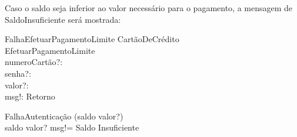 \documentclass{article}
\begin{document}
Caso o saldo seja inferior ao valor necessário para o pagamento, a mensagem de SaldoInsuficiente será mostrada:

\begin{schema}{FalhaEfetuarPagamentoLimite}
    \Xi CartãoDeCrédito\\
    \Xi EfetuarPagamentoLimite\\
    numeroCartão?: \nat\\
    senha?: \nat\\
    valor?: \real\\
    msg!: Retorno

    \where
   \Xi FalhaAutenticação \lor (saldo \leq valor?)\\
   \IF saldo \leq valor? \THEN msg!= Saldo Insuficiente
    
\end{schema}
\end{document}
